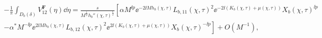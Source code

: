 \begin{multline}
-\frac{1}{\pi} \int_{D_{b}(\delta)} V^{\mathbf{F}}_{12}(\eta)\dd \eta =
\frac{s}{M^{\frac{1}{2}}  h_b''(\chi,\tau)^{\frac{1}{2}}}
 \left[ 
\alpha M^{\ii p} \ee^{-2\ii M {h}_b(\chi,\tau)} 
L_{b,11}(\chi,\tau)^2 \ee^{-2 \ii (K_b(\chi,\tau) + \mu(\chi,\tau) )}  X_b(\chi,\tau)^{\ii p}
\right.\\
\left. - \alpha^{*} M^{-\ii p} \ee^{2\ii M {h}_b(\chi,\tau)}
L_{b,12}(\chi,\tau)^2 \ee^{2\ii (K_b(\chi,\tau) + \mu(\chi,\tau) )}  X_b(\chi,\tau)^{-\ii p}
\right] + O(M^{-1}),
\label{eq:V-F-12-b-residue}
\end{multline}
